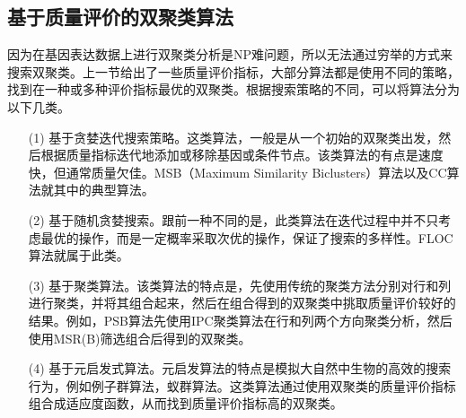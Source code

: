   \subsection{基于质量评价的双聚类算法}
  因为在基因表达数据上进行双聚类分析是NP难问题，所以无法通过穷举的方式来搜索双聚类。上一节给出了一些质量评价指标，大部分算法都是使用不同的策略，找到在一种或多种评价指标最优的双聚类。根据搜索策略的不同，可以将算法分为以下几类。
  \begin{enumerate}
    \item[(1)] 基于贪婪迭代搜索策略。这类算法，一般是从一个初始的双聚类出发，然后根据质量指标迭代地添加或移除基因或条件节点。该类算法的有点是速度快，但通常质量欠佳。MSB（Maximum Similarity Biclusters）算法以及CC算法就其中的典型算法。

    \item[(2)] 基于随机贪婪搜索。跟前一种不同的是，此类算法在迭代过程中并不只考虑最优的操作，而是一定概率采取次优的操作，保证了搜索的多样性。FLOC算法就属于此类。
    
    \item[(3)] 基于聚类算法。该类算法的特点是，先使用传统的聚类方法分别对行和列进行聚类，并将其组合起来，然后在组合得到的双聚类中挑取质量评价较好的结果。例如，PSB算法先使用IPC聚类算法在行和列两个方向聚类分析，然后使用MSR(B)筛选组合后得到的双聚类。
    
    \item[(4)] 基于元启发式算法。元启发算法的特点是模拟大自然中生物的高效的搜索行为，例如例子群算法，蚁群算法。这类算法通过使用双聚类的质量评价指标组合成适应度函数，从而找到质量评价指标高的双聚类。
  \end{enumerate}

